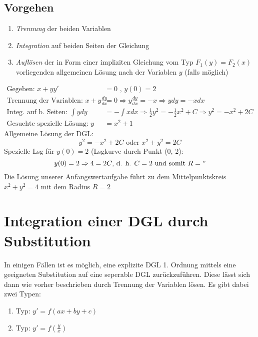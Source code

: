 \subsection{Vorgehen}
\begin{enumerate}
	\item \textit{Trennung} der beiden Variablen
	\item \textit{Integration} auf beiden Seiten der Gleichung
	\item \textit{Auflösen} der in Form einer impliziten Gleichung vom Typ $F_1(y) = F_2(x)$ vorliegenden allgemeinen Lösung nach der Variablen $y$ (falls möglich)
\end{enumerate}

\begin{bsp}
\begin{align*}
	 \text{Gegeben: }x + yy' &= 0\text{ , } y(0) = 2\\
	  \text{Trennung der Variablen: } x+y \frac{dy}{dx} &= 0 \Rightarrow y\frac{dy}{dx} = -x \Rightarrow y dy = -x dx \\
	  \text{Integ. auf b. Seiten: } \int y dy &= - \int x dx \Rightarrow \frac{1}{2}y^2 = - \frac{1}{2}x^2 + C \Rightarrow y^2 = -x^2 + 2C \\
	  \text{Gesuchte spezielle Lösung: } y &= x^2 + 1
\end{align*}
Allgemeine Lösung der DGL:
	 $$y^2 = -x ^2 + 2 C \text{      oder      } x^2 + y^2 = 2C$$
Spezielle Lsg für $y(0) = 2$ (Lsgkurve durch Punkt (0, 2):
$$y(0) = 2 \Rightarrow 4 = 2C \text{, d. h. } C = 2 \text{ und somit } R = "$$
Die Lösung unserer Anfangswertaufgabe führt zu dem Mittelpunktskreis $x^2 + y^2 = 4$ mit dem Radius $R = 2$
\end{bsp}

\section{Integration einer DGL durch Substitution}
In einigen Fällen ist es möglich, eine explizite DGL 1. Ordnung mittels eine geeigneten Substitution auf eine seperable DGL zurückzuführen. Diese lässt sich dann wie vorher beschrieben durch Trennung der Variablen lösen. Es gibt dabei zwei Typen:
\begin{enumerate}
	\item Typ: $y' = f(ax + by + c)$
	\item Typ: $y' = f(\frac{y}{x})$
\end{enumerate}

